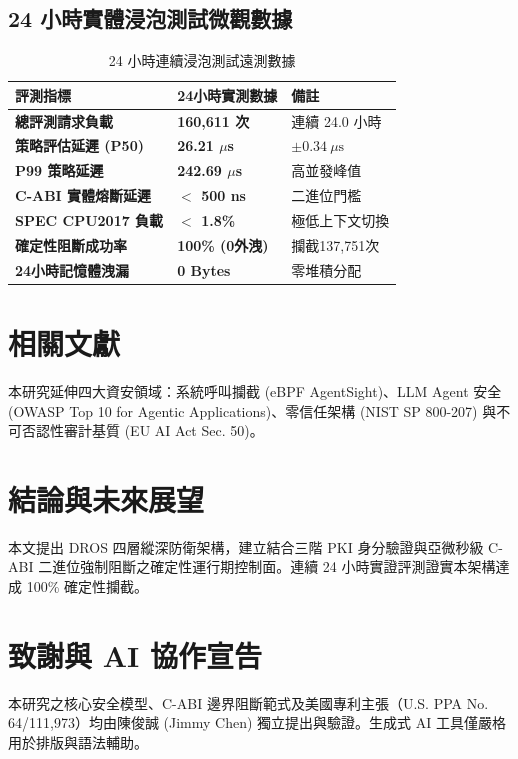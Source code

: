 \documentclass[conference]{IEEEtran}
\begin{document}
\subsection{24 小時實體浸泡測試微觀數據}

\begin{table}[htbp]
\caption{24 小時連續浸泡測試遠測數據}
\begin{center}
\begin{tabular}{|p{3.5cm}|p{2.2cm}|p{2.0cm}|}
\hline
\textbf{評測指標} & \textbf{24小時實測數據} & \textbf{備註} \\ \hline
\textbf{總評測請求負載} & \textbf{160,611 次} & 連續 24.0 小時 \\ \hline
\textbf{策略評估延遲 (P50)} & \textbf{26.21 $\mu$s} & $\pm 0.34\ \mu\text{s}$ \\ \hline
\textbf{P99 策略延遲} & \textbf{242.69 $\mu$s} & 高並發峰值 \\ \hline
\textbf{C-ABI 實體熔斷延遲} & \textbf{$<$ 500 ns} & 二進位門檻 \\ \hline
\textbf{SPEC CPU2017 負載} & \textbf{$<$ 1.8\%} & 極低上下文切換 \\ \hline
\textbf{確定性阻斷成功率} & \textbf{100\% (0外洩)} & 攔截137,751次 \\ \hline
\textbf{24小時記憶體洩漏} & \textbf{0 Bytes} & 零堆積分配 \\ \hline
\end{tabular}
\end{center}
\end{table}

\section{相關文獻}
本研究延伸四大資安領域：系統呼叫攔截 (eBPF AgentSight)、LLM Agent 安全 (OWASP Top 10 for Agentic Applications)、零信任架構 (NIST SP 800-207) 與不可否認性審計基質 (EU AI Act Sec. 50)。

\section{結論與未來展望}
本文提出 DROS 四層縱深防衛架構，建立結合三階 PKI 身分驗證與亞微秒級 C-ABI 二進位強制阻斷之確定性運行期控制面。連續 24 小時實證評測證實本架構達成 100\% 確定性攔截。

\section*{致謝與 AI 協作宣告}
本研究之核心安全模型、C-ABI 邊界阻斷範式及美國專利主張（U.S. PPA No. 64/111,973）均由陳俊誠 (Jimmy Chen) 獨立提出與驗證。生成式 AI 工具僅嚴格用於排版與語法輔助。
\end{document}
